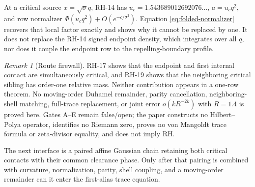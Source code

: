 \documentclass[11pt]{article}
\theoremstyle{remark}
\newtheorem{remark}[theorem]{Remark}
\begin{document}
At a critical source $x=\sqrt\sigma q$, RH-14 has
$u_c=1.543689012692076\ldots$, $a=u_cq^2$, and row normalizer
$\Phi(u_cq^2)+O(e^{-c/\sigma^2})$.
Equation \eqref{eq:folded-normalizer} recovers that local factor exactly and
shows why it cannot be replaced by one.  It does not replace the RH-14 signed
endpoint density, which integrates over all $q$, nor does it couple the
endpoint row to the repelling-boundary profile.

\begin{remark}[Route firewall]
RH-17 shows that the endpoint and first internal contact are simultaneously
critical, and RH-19 shows that the neighboring critical sibling has order-one
relative mass.  Neither contribution appears in a one-row theorem.  No
moving-order Duhamel remainder, parity cancellation, neighboring-shell
matching, full-trace replacement, or joint error $o(kR^{-2k})$ with
$R=1.4$ is proved
here.  Gates A--E remain false/open; the paper constructs no Hilbert--Polya
operator, identifies no Riemann zero, proves no von Mangoldt trace formula or
zeta-divisor equality, and does not imply RH.
\end{remark}

The next interface is a paired affine Gaussian chain retaining both critical
contacts with their common clearance phase.  Only after that pairing is
combined with curvature, normalization, parity, shell coupling, and a
moving-order remainder can it enter the first-alias trace equation.
\end{document}

